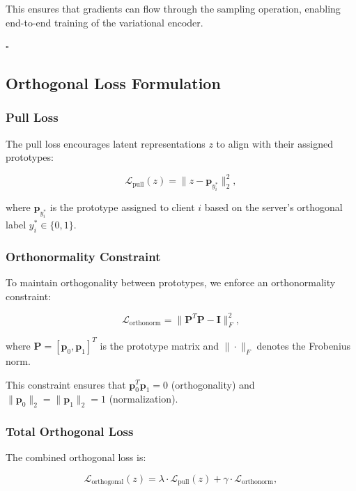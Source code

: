 This ensures that gradients can flow through the sampling operation, enabling end-to-end training of the variational encoder.

$\square$

\subsection{Orthogonal Loss Formulation}

\subsubsection{Pull Loss}

The pull loss encourages latent representations $z$ to align with their assigned prototypes:

\begin{equation}
\mathcal{L}_{\text{pull}}(z) = \|z - \mathbf{p}_{y_i^*}\|_2^2,
\end{equation}

where $\mathbf{p}_{y_i^*}$ is the prototype assigned to client $i$ based on the server's orthogonal label $y_i^* \in \{0, 1\}$.

\subsubsection{Orthonormality Constraint}

To maintain orthogonality between prototypes, we enforce an orthonormality constraint:

\begin{equation}
\mathcal{L}_{\text{orthonorm}} = \|\mathbf{P}^T \mathbf{P} - \mathbf{I}\|_F^2,
\end{equation}

where $\mathbf{P} = [\mathbf{p}_0, \mathbf{p}_1]^T$ is the prototype matrix and $\|\cdot\|_F$ denotes the Frobenius norm.

This constraint ensures that $\mathbf{p}_0^T \mathbf{p}_1 = 0$ (orthogonality) and $\|\mathbf{p}_0\|_2 = \|\mathbf{p}_1\|_2 = 1$ (normalization).

\subsubsection{Total Orthogonal Loss}

The combined orthogonal loss is:

\begin{equation}
\mathcal{L}_{\text{orthogonal}}(z) = \lambda \cdot \mathcal{L}_{\text{pull}}(z) + \gamma \cdot \mathcal{L}_{\text{orthonorm}},
\end{equation}

